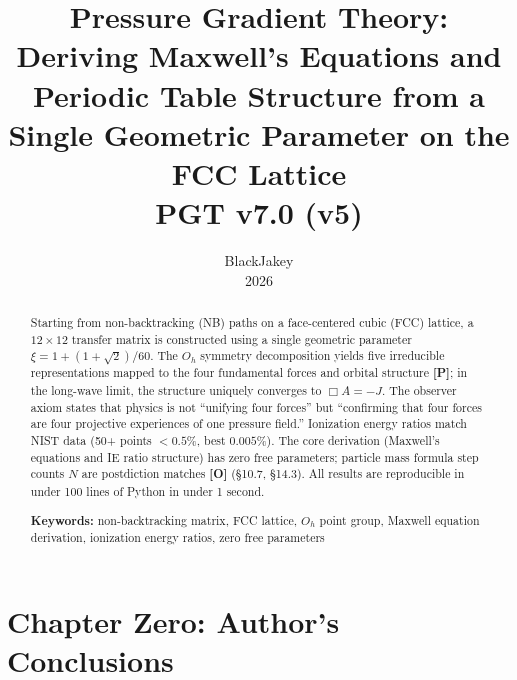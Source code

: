 \documentclass[11pt,a4paper]{article}
\title{\textbf{Pressure Gradient Theory: Deriving Maxwell's Equations and Periodic Table Structure from a Single Geometric Parameter on the FCC Lattice}\\[8pt]
\large PGT v7.0 (v5)}
\author{BlackJakey\\[2pt]{\small 2026}}
\date{}
\newcommand{\gradeP}{\textbf{[P]}}
\newcommand{\gradeO}{\textbf{[O]}}
\begin{document}
\maketitle
\thispagestyle{fancy}

\begin{abstract}
Starting from non-backtracking (NB) paths on a face-centered cubic (FCC) lattice, a $12\times 12$ transfer matrix is constructed using a single geometric parameter $\xi = 1+(1+\sqrt{2})/60$. The $O_h$ symmetry decomposition yields five irreducible representations mapped to the four fundamental forces and orbital structure \gradeP; in the long-wave limit, the structure uniquely converges to $\Box A = -J$. The observer axiom states that physics is not ``unifying four forces'' but ``confirming that four forces are four projective experiences of one pressure field.'' Ionization energy ratios match NIST data (50+ points $<0.5\%$, best $0.005\%$). The core derivation (Maxwell's equations and IE ratio structure) has zero free parameters; particle mass formula step counts $N$ are postdiction matches \gradeO{} (\S10.7, \S14.3). All results are reproducible in under 100 lines of Python in under 1 second.

\medskip\noindent
\textbf{Keywords:} non-backtracking matrix, FCC lattice, $O_h$ point group, Maxwell equation derivation, ionization energy ratios, zero free parameters
\end{abstract}

\tableofcontents
\newpage

\section{Chapter Zero: Author's Conclusions}\label{sec:ch0}
\end{document}
